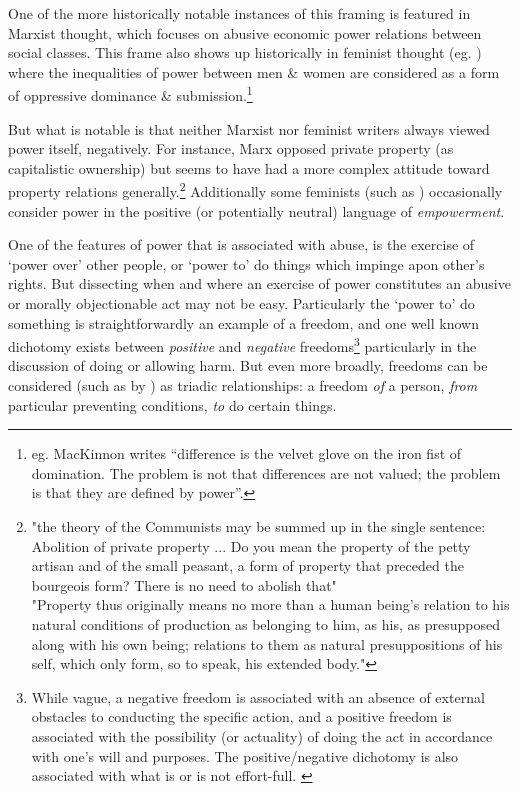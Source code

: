 One of the more historically notable instances of this framing is featured in Marxist thought, which focuses on abusive economic power relations between social classes. This frame also shows up historically in feminist thought (eg. \cite{Cudd2006-CUDAO}) where the inequalities of power between men \& women are considered as a form of oppressive dominance \& submission.\footnote{eg. MacKinnon writes ``difference is the velvet glove on the iron fist of domination. The problem is not that differences are not valued; the problem is that they are defined by power''\cite{mackinnon1989toward}.}

But what is notable is that neither Marxist nor feminist writers always viewed power itself, negatively.
For instance, Marx opposed private property (as capitalistic ownership) but seems to have had a more complex attitude toward property relations generally.\footnote{"the theory of the Communists may be summed up in the single sentence: Abolition of private property ... Do you mean the property of the petty artisan and of the small peasant, a form of property that preceded the bourgeois form? There is no need to abolish that"\cite{MarxGutenberg}\\"Property thus originally means no more than a human being's relation to his natural conditions of production as belonging to him, as his, as presupposed along with his own being; relations to them as natural presuppositions of his self, which only form, so to speak, his extended body."\cite[Notebook V]{marx1993grundrisse}}
Additionally some feminists (such as \cite{doi:10.1111/j.1527-2001.1998.tb01350.x}) occasionally consider power in the positive (or potentially neutral) language of \textit{empowerment}.

One of the features of power that is associated with abuse, is the exercise of `power over' other people, or `power to' do things which impinge apon other's rights.
But dissecting when and where an exercise of power constitutes an abusive or morally objectionable act may not be easy.
Particularly the `power to' do something is straightforwardly an example of a freedom, and one well known dichotomy exists between \textit{positive} and \textit{negative} freedoms\footnote{While vague, a negative freedom is associated with an absence of external obstacles to conducting the specific action, and a positive freedom is associated with the possibility (or actuality) of doing the act in accordance with one's will and purposes. The positive/negative dichotomy is also associated with what is or is not effort-full. \citep{Mossel2009-MOSNA}} particularly in the discussion of doing or allowing harm.
But even more broadly, freedoms can be considered (such as by \cite{Negative_and_Positive_Freedom}) as triadic relationships: a freedom \textit{of} a person, \textit{from} particular preventing conditions, \textit{to} do certain things.

